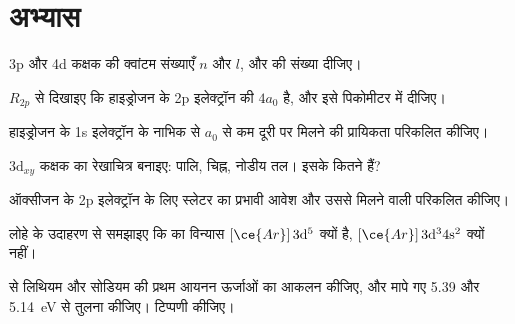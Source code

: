 \section{अभ्यास}

\begin{exercise}[$\star$]\label{exo:b2:atomic-orbitals:1}
3p और 4d कक्षक की क्वांटम संख्याएँ $n$ और $l$,  और  की
संख्या दीजिए।
\end{exercise}

\begin{exercise}[$\star$]\label{exo:b2:atomic-orbitals:2}
$R_{2p}$ से दिखाइए कि हाइड्रोजन के 2p इलेक्ट्रॉन की 
$4a_0$ है, और इसे पिकोमीटर में दीजिए।
\end{exercise}

\begin{exercise}[$\star$]\label{exo:b2:atomic-orbitals:3}
हाइड्रोजन के 1s इलेक्ट्रॉन के नाभिक से $a_0$ से कम दूरी पर मिलने की प्रायिकता
परिकलित कीजिए।
\end{exercise}

\begin{exercise}[$\star$]\label{exo:b2:atomic-orbitals:4}
$3\mathrm d_{xy}$ कक्षक का रेखाचित्र बनाइए: पालि, चिह्न, नोडीय तल। इसके कितने  हैं?
\end{exercise}

\begin{exercise}[$\star\star$]\label{exo:b2:atomic-orbitals:5}
ऑक्सीजन के 2p इलेक्ट्रॉन के लिए स्लेटर का प्रभावी आवेश और उससे मिलने वाली  परिकलित कीजिए।
\end{exercise}

\begin{exercise}[$\star\star$]\label{exo:b2:atomic-orbitals:6}
लोहे के उदाहरण से समझाइए कि  का विन्यास
$[\ce{Ar}]\,3\mathrm d^5$ क्यों है, $[\ce{Ar}]\,3\mathrm d^3 4\mathrm s^2$ क्यों नहीं।
\end{exercise}

\begin{exercise}[$\star\star$]\label{exo:b2:atomic-orbitals:7}
 से लिथियम और सोडियम की प्रथम आयनन ऊर्जाओं का आकलन कीजिए,
और मापे गए 5.39 और \qty{5.14}{eV} से तुलना कीजिए। टिप्पणी कीजिए।
\end{exercise}

